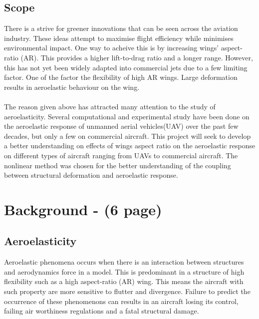 \documentclass[11pt]{article}
\begin{document}
\subsection{Scope} 
There is a strive for greener innovations that can be seen across the aviation industry. These ideas attempt to maximise flight efficiency while minimises environmental impact. One way to acheive this is by increasing wings' aspect-ratio (AR). This provides a higher lift-to-drag ratio and a longer range. However, this has not yet been widely adapted into commercial jets due to a few limiting factor. One of the factor the flexibility of high AR wings. Large deformation results in aeroelastic behaviour on the wing.\\ \\
The reason given above has attracted many attention to the study of aeroelasticity. Several computational and experimental study have been done on the aeroelastic response of unmanned aerial vehicles(UAV) over the past few decades, but only a few on commercial aircraft. This project will seek to develop a better understanding on effects of wings aspect ratio on the aeroelastic response on different types of aircraft ranging from UAVs to commercial aircraft. The nonlinear method was chosen for the better understanding of the coupling between structural deformation and aeroelastic response. 

\newpage
\section{Background - (6 page)}

\subsection{Aeroelasticity}
Aeroelastic phenomena occurs when there is an interaction between structures and aerodynamics force in a model. This is predominant in a structure of high flexibility such as a high aspect-ratio (AR) wing. This means the aircraft with such property are more sensitive to flutter and divergence. Failure to predict the occurrence of these phenomenons can results in an aircraft losing its control, failing air worthiness regulations and a fatal structural damage.\\
\end{document}
